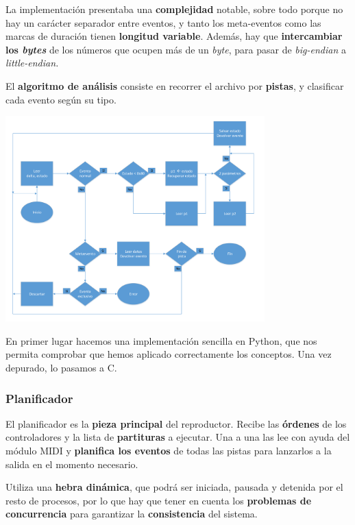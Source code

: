 \documentclass[10pt,a4paper]{article}
\begin{document}
	La implementación presentaba una \textbf{complejidad} notable, sobre todo porque no hay un carácter separador entre eventos, y tanto los meta-eventos como las marcas de duración tienen \textbf{longitud variable}. Además, hay que \textbf{intercambiar los \textit{bytes}} de los números que ocupen más de un \textit{byte}, para pasar de \textit{big-endian} a \textit{little-endian.}
	
	El \textbf{algoritmo de análisis} consiste en recorrer el archivo por \textbf{pistas}, y clasificar cada evento según su tipo.
	
	\begin{center}
		\includegraphics[width=0.75\textwidth]{images/flujo_parser}
	\end{center}
	
	En primer lugar hacemos una implementación sencilla en Python, que nos permita comprobar que hemos aplicado correctamente los conceptos. Una vez depurado, lo pasamos a C.
	
	\subsubsection*{Planificador}
	
	El planificador es la \textbf{pieza principal} del reproductor. Recibe las \textbf{órdenes} de los controladores y la lista de \textbf{partituras} a ejecutar. Una a una las lee con ayuda del módulo MIDI y \textbf{planifica los eventos} de todas las pistas para lanzarlos a la salida en el momento necesario.
	
	Utiliza una \textbf{hebra dinámica}, que podrá ser iniciada, pausada y detenida por el resto de procesos, por lo que hay que tener en cuenta los \textbf{problemas de concurrencia} para garantizar la \textbf{consistencia} del sistema.
	
\end{document}
